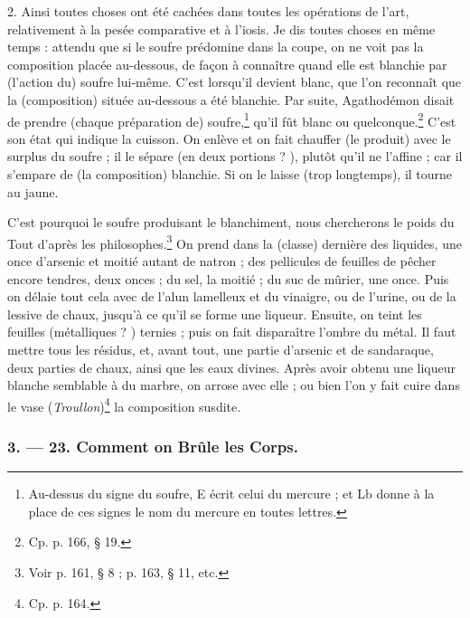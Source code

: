 \documentclass[landscape, a4paper, 11pt, oneside, polutonikogreek, french]{article}
\begin{document}
2. Ainsi toutes choses ont été cachées dans toutes les opérations de l'art, relativement à la pesée comparative et à l'iosis. Je dis toutes choses en même temps : attendu que si le soufre prédomine dans la coupe, on ne voit pas la composition placée au-dessous, de façon à connaître quand elle est blanchie par (l'action du) soufre lui-même. C'est lorsqu'il devient blanc, que l'on reconnaît que la (composition) située au-dessous a été blanchie. Par suite, Agathodémon disait de prendre (chaque préparation de) soufre,\footnote{Au-dessus du signe du soufre, E écrit celui du mercure ; et Lb donne à la place de ces signes le nom du mercure en toutes lettres.} qu'il fût blanc ou quelconque.\footnote{Cp. p. 166, § 19.} C'est son état qui indique la cuisson. On enlève et on fait chauffer (le produit) avec le surplus du soufre ; il le sépare (en deux portions ? ), plutôt qu'il ne l'affine ; car il s'empare de (la composition) blanchie. Si on le laisse (trop longtemps), il tourne au jaune.

C'est pourquoi le soufre produisant le blanchiment, nous chercherons le poids du Tout d'après les philosophes.\footnote{Voir p. 161, § 8 ; p. 163, § 11, etc.} On prend dans la (classe) dernière des liquides, une once d'arsenic et moitié autant de natron ; des pellicules de feuilles de pêcher encore tendres, deux onces ; du sel, la moitié ; du suc de mûrier, une once. Puis on délaie tout cela avec de l'alun lamelleux et du vinaigre, ou de l'urine, ou de la lessive de chaux, jusqu'à ce qu'il se forme une liqueur. Ensuite, on teint les feuilles (métalliques ? ) ternies ; puis on fait disparaître l'ombre du métal. Il faut mettre tous les résidus, et, avant tout, une partie d'arsenic et de sandaraque, deux parties de chaux, ainsi que les eaux divines. Après avoir obtenu une liqueur blanche semblable à du marbre, on arrose avec elle ; ou bien l'on y fait cuire dans le vase (\emph{Troullon})\footnote{Cp. p. 164.} la composition susdite.

\bigskip
\centerline{\EightStarTaper}
\centerline{\EightStarTaper\EightStarTaper}
\bigskip

\subsubsection{3. --- 23. Comment on Brûle les Corps.}
\end{document}

